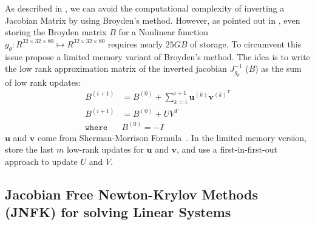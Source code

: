 As described in , we can avoid the computational complexity of inverting a Jacobian Matrix by using Broyden's method. However, as pointed out in \citet{bai_multiscale_2020}, even storing the Broyden matrix $B$ for a Nonlinear function $g_\theta: R^{32 \times 32 \times 80} \mapsto R^{32 \times 32 \times 80}$ requires nearly $25GB$ of storage. To circumvent this issue \citet{bai_multiscale_2020} propose a limited memory variant of Broyden's method. The idea is to write the low rank approximation matrix of the inverted jacobian $J^{-1}_{g_\theta}$ ($B$) as the sum of low rank updates:
%
\begin{align}
  B^{(i + 1)}     & = B^{(0)} + \sum_{k = i}^{i + 1} \mathbf{u}^{(k)} \mathbf{v}^{(k)^T} \\
  B^{(i + 1)}     & = B^{(0)} + UV^T                                                     \\
  \texttt{where } & B^{(0)} = -I
\end{align}
%
$\mathbf{u}$ and $\mathbf{v}$ come from Sherman-Morrison Formula~\citep{sherman1950adjustment}. In the limited memory version, \citet{bai_multiscale_2020} store the last $m$ low-rank updates for $\mathbf{u}$ and $\mathbf{v}$, and use a first-in-first-out approach to update $U$ and $V$.

\subsection{Jacobian Free Newton-Krylov Methods (JNFK) for solving Linear Systems}
\label{subsec:newton_krylov_methods}




